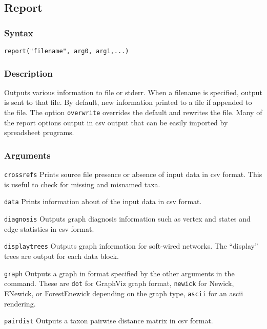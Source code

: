 \documentclass[11pt]{article}
\begin{document}
	\subsection{Report}
		\subsubsection{Syntax}
				\texttt{report("filename", arg0, arg1,...)}
		\subsubsection{Description}
			Outputs various information to file or stderr.  When a filename is specified, output is sent to that file.  By default, new information printed to a file
			if appended to the file.  The option \texttt{overwrite} overrides the default and rewrites the file.  Many of the report options output in csv output that
			can be easily imported by spreadsheet programs.
		\subsubsection{Arguments}
				\noindent \texttt{crossrefs} Prints source file presence or absence of input data in csv format.  This is useful to check for 
				missing and misnamed taxa.
			
				\smallskip
				\noindent \texttt{data} Prints information about of the input data in csv format.
				
				\smallskip
				\noindent \texttt{diagnosis}  Outputs graph diagnosis information such as vertex and states and edge statistics in csv format. 
			
				\smallskip
				\noindent \texttt{displaytrees}  Outputs graph information for soft-wired networks.  The ``display'' trees are output for each data block. 
				
				\smallskip
				\noindent \texttt{graph} Outputs a graph in format specified by the other arguments in the command.  These are \texttt{dot} for GraphViz graph format,
				\texttt{newick} for Newick, ENewick, or ForestEnewick depending on the graph type, \texttt{ascii} for an ascii rendering.  
				
				\smallskip
				\noindent \texttt{pairdist} Outputs a taxon pairwise distance matrix in csv format.  
				
\end{document}
